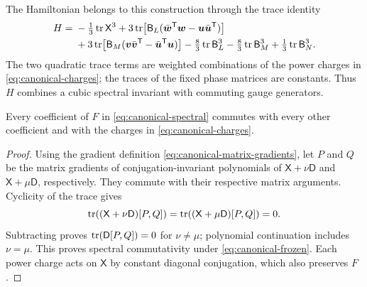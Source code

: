 The Hamiltonian belongs to this construction through the trace identity
\begin{align}\label{eq:canonical-trace-H}
 H={}&-\tfrac13\operatorname{tr}\mathsf X^3
      +3\operatorname{tr}\!\left[\mathsf B_L
        (\bar{\boldsymbol w}^{\mathsf T}\boldsymbol w
                     -\boldsymbol u\bar{\boldsymbol u}^{\mathsf T})\right]
        \nonumber\\
 &+3\operatorname{tr}\!\left[\mathsf B_M
        (\boldsymbol v\bar{\boldsymbol v}^{\mathsf T}
                     -\bar{\boldsymbol u}^{\mathsf T}\boldsymbol u)\right]
      -\tfrac83\operatorname{tr}\mathsf B_L^3
      -\tfrac83\operatorname{tr}\mathsf B_M^3
      +\tfrac13\operatorname{tr}\mathsf B_N^3.
\end{align}
The two quadratic trace terms are weighted combinations of the power
charges in \cref{eq:canonical-charges}; the traces of the fixed phase
matrices are constants. Thus $H$ combines a cubic spectral invariant
with commuting gauge generators.

\begin{proposition}\label{prop:canonical-commutation}
Every coefficient of $F$ in \cref{eq:canonical-spectral} commutes
with every other coefficient and with the charges in
\cref{eq:canonical-charges}.
\end{proposition}
\begin{proof}
Using the gradient definition \cref{eq:canonical-matrix-gradients},
let $P$ and $Q$ be the matrix gradients of conjugation-invariant polynomials
of $\mathsf X+\nu\mathsf D$ and $\mathsf X+\mu\mathsf D$,
respectively. They commute with their respective matrix arguments.
Cyclicity of the trace gives
\[
 \operatorname{tr}((\mathsf X+\nu\mathsf D)[P,Q])
 =\operatorname{tr}((\mathsf X+\mu\mathsf D)[P,Q])=0.
\]
Subtracting proves $\operatorname{tr}(\mathsf D[P,Q])=0$ for $\nu\ne\mu$;
polynomial continuation includes $\nu=\mu$. This proves spectral
commutativity under \cref{eq:canonical-frozen}. Each power charge
acts on $\mathsf X$ by constant diagonal conjugation, which also
preserves $F$.
\end{proof}



